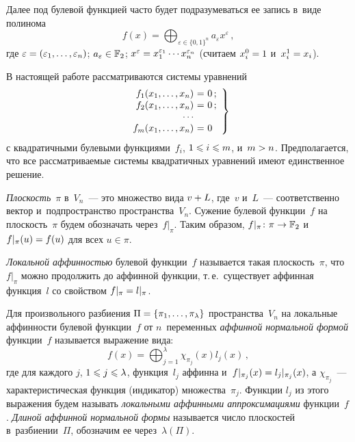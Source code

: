 \begin{multicols}{2}
Далее под булевой функцией часто будет под\-разуме\-вать\-ся ее запись в~виде полинома
$$
f(x)=\bigoplus_{\varepsilon\in\{0,1\}^n} a_{\varepsilon}x^{\varepsilon}\,,
$$
где %
$\varepsilon\hm=(\varepsilon_1,\ldots,\varepsilon_n)$;
$a_{\varepsilon}\hm\in\mathbb{F}_2$; 
$x^{\varepsilon}\hm=x_1^{\varepsilon_1}\cdots x_n^{\varepsilon_n}$ (считаем 
$x_i^0\hm=1$ и~$x_i^1\hm=x_i$).


В настоящей работе рассматриваются системы уравнений
\begin{equation}
\label{system}
\left.
    \begin{array}{r@{\ }c@{\ }l}
        f_1(x_1,\ldots,x_n)&=&0\,;\\
        f_2(x_1,\ldots,x_n)&=&0\,;\\
        \cdots\\
        f_m(x_1,\ldots,x_n)&=&0\\
    \end{array}
  \right\}
\end{equation}
с квадратичными булевыми функциями~$f_i$, $1\hm\leqslant i\hm\leqslant m$, и~$m\hm>n$.
Предполагается, что все рассматриваемые системы квадратичных уравнений имеют 
единственное решение.


\textit{Плоскость}~$\pi$ в~$V_n$~--- это множество вида $v\hm+L$, где~$v$ и~$L$~--- 
соответственно вектор и~подпространство пространства~$V_n$.
Сужение булевой функции~$f$ на плоскость~$\pi$ будем обозначать 
через~$f|_{\pi}$. Таким образом, $f|_{\pi}\colon \pi\hm\to\mathbb{F}_2$ 
и~$f|_{\pi}(u)\hm=f(u)$ для всех $u\in\pi$.


\textit{Локальной аффинностью} булевой функции~$f$ называется такая 
плоскость~$\pi$, что $f|_{\pi}$ можно продолжить до аффинной функции, т.\,е.\ 
существует аффинная функция~$l$ со свойством $f|_{\pi}\hm=l|_{\pi}$.

Для произвольного разбиения $\Pi\hm=\{\pi_1,\ldots,\pi_{\lambda}\}$ 
пространства~$V_n$ на локальные аффинности булевой функции~$f$ от $n$~переменных
\textit{аффинной нормальной формой} функции~$f$ называется выражение вида:
\begin{equation}
\label{AffNF}
f(x)=\bigoplus_{j=1}^{\lambda}\chi_{\pi_j}(x) l_j(x)\,,
\end{equation}
где для каждого $j$, $1\hm\leqslant j\hm\leqslant\lambda$, функция~$l_j$ аффинна 
и~$f|_{\pi_j}(x)\hm=l_j|_{\pi_j}(x)$, а $\chi_{\pi_j}$~--- характеристическая 
функция (индикатор) множества~$\pi_j$.
Функции $l_j$ из этого выражения будем называть \textit{локальными аффинными 
аппроксимациями} функции~$f$.
\textit{Длиной аффинной нормальной формы} называется число плоскостей 
в~разбиении~$\Pi$, обозначим ее через~$\lambda(\Pi)$.


\end{multicols}
